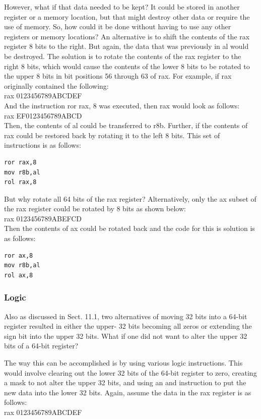 \documentclass[10pt]{article}
\begin{document}
However, what if that data needed to be kept? It could be stored in another register or a memory location, but that might destroy other data or require the use of memory. So, how could it be done without having to use any other registers or memory locations? An alternative is to shift the contents of the rax register 8 bits to the right. But again, the data that was previously in al would be destroyed. The solution is to rotate the contents of the rax register to the right 8 bits, which would cause the contents of the lower 8 bits to be rotated to the upper 8 bits in bit positions 56 through 63 of rax. For example, if rax originally contained the following:\\
rax 0123456789ABCDEF\\
And the instruction ror rax, 8 was executed, then rax would look as follows:\\
rax EF0123456789ABCD\\
Then, the contents of al could be transferred to r8b. Further, if the contents of rax could be restored back by rotating it to the left 8 bits. This set of instructions is as follows:

\begin{verbatim}
ror rax,8
mov r8b,al
rol rax,8
\end{verbatim}

But why rotate all 64 bits of the rax register? Alternatively, only the ax subset of the rax register could be rotated by 8 bits as shown below:\\
rax 0123456789ABEFCD\\
Then the contents of ax could be rotated back and the code for this is solution is as follows:

\begin{verbatim}
ror ax,8
mov r8b,al
rol ax,8
\end{verbatim}

\subsubsection*{Logic}
Also as discussed in Sect. 11.1, two alternatives of moving 32 bits into a 64-bit register resulted in either the upper- 32 bits becoming all zeros or extending the sign bit into the upper 32 bits. What if one did not want to alter the upper 32 bits of a 64-bit register?

The way this can be accomplished is by using various logic instructions. This would involve clearing out the lower 32 bits of the 64-bit register to zero, creating a mask to not alter the upper 32 bits, and using an and instruction to put the new data into the lower 32 bits. Again, assume the data in the rax register is as follows:\\
rax 0123456789ABCDEF
\end{document}
